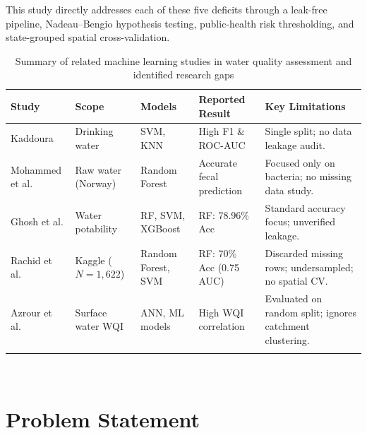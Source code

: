 \documentclass[pdflatex,sn-mathphys-num]{sn-jnl}%
\theoremstyle{thmstyleone}%
\theoremstyle{thmstyletwo}%
\theoremstyle{thmstylethree}%
\begin{document}
This study directly addresses each of these five deficits through a leak-free pipeline, Nadeau--Bengio hypothesis testing, public-health risk thresholding, and state-grouped spatial cross-validation.
\begin{table}[t]
\caption{Summary of related machine learning studies in water quality assessment and identified research gaps}\label{tab_lit_review}%
\footnotesize
\begin{tabular}{@{}p{}p{}p{}p{}p{}@{}}
\toprule
Study & Scope & Models & Reported Result & Key Limitations\footnotemark[1] \\
\midrule
Kaddoura \cite{kaddoura2022} & Drinking water & SVM, KNN & High F1 \& ROC-AUC & Single split; no data leakage audit. \\
Mohammed et al. \cite{mohammed2017} & Raw water (Norway) & Random Forest & Accurate fecal prediction & Focused only on bacteria; no missing data study. \\
Ghosh et al. \cite{ghosh2023} & Water potability & RF, SVM, XGBoost & RF: 78.96\% Acc & Standard accuracy focus; unverified leakage. \\
Rachid et al. \cite{rachid2025}\footnotemark[2] & Kaggle ($N=1,622$) & Random Forest, SVM & RF: 70\% Acc (0.75 AUC) & Discarded missing rows; undersampled; no spatial CV. \\
Azrour et al. \cite{azrour2022} & Surface water WQI & ANN, ML models & High WQI correlation & Evaluated on random split; ignores catchment clustering. \\
\botrule
\end{tabular}
\end{table}
\\
\section{Problem Statement}\label{sec3}
\end{document}
